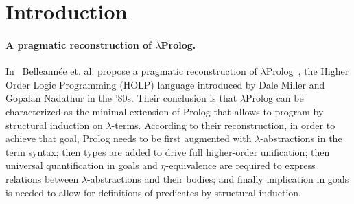 \documentclass{easychair}
\begin{document}
\begin{abstract}


\end{abstract}

\section{Introduction}\label{sec:introduction}

\paragraph{A pragmatic reconstruction of $\lambda$Prolog.}

In~\cite{jlp98} Belleannée et. al. propose a pragmatic reconstruction
of $\lambda$Prolog~\cite{lambdap1,lambdap2,lambdap3}, the Higher Order
Logic Programming (HOLP) language introduced by Dale Miller and
Gopalan Nadathur in the '80s.
Their conclusion is that $\lambda$Prolog can be characterized as the
minimal extension of Prolog that allows to program by structural
induction on $\lambda$-terms. According to their reconstruction, in
order to achieve that goal, Prolog needs to be first augmented with
$\lambda$-abstractions in the term syntax; then types are added to
drive full higher-order unification; then universal quantification in
goals and $\eta$-equivalence are required to express relations between
$\lambda$-abstractions and their bodies; and finally implication in
goals is needed to allow for definitions of predicates by structural induction.
\end{document}

